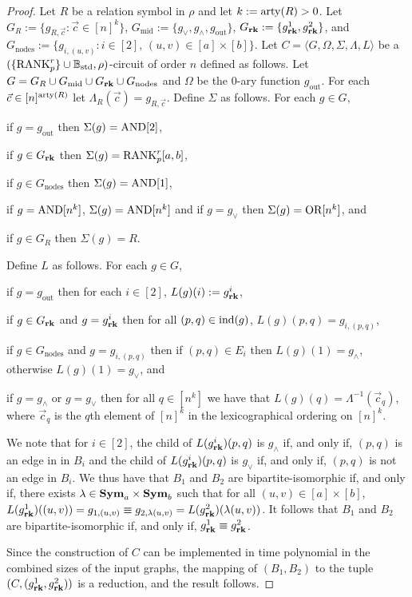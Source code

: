 \documentclass[../paper.tex]{subfiles}
\begin{document}
\begin{proof}
  Let $R$ be a relation symbol in $\rho$ and let $k := \mathrm{arty}(R) > 0$. Let $G_{R}
  := \{g_{R, \vec{c}} : \vec{c} \in [n]^k\}$, $G_{\text{mid}} := \{g_{\lor},
  g_{\land}, g_{\text{out}} \}$, $G_{\text{\textbf{rk}}} : = \{ g^1_{\text{\textbf{rk}}}, g^2_{\text{\textbf{rk}}}\}$,
  and $G_{\text{nodes}} := \{g_{i, (u,v)} : i \in [2] ,\, (u,v) \in [a] \times
  [b] \}$. Let $C = \langle G, \Omega, \Sigma, \Lambda, L \rangle$ be a
  $(\{\text{\upshape RANK}^{r}_p\} \cup \mathbb{B}_{\text{std}}, \rho)$-circuit of order $n$ defined as follows.
  Let $G = G_R \cup G_{\text{mid}} \cup G_{\text{\textbf{rk}}} \cup G_{\text{nodes}}$ and
  $\Omega$ be the $0$-ary function $g_{\text{out}}$. For each $\vec{c} \in
  [n]^{\mathrm{arty}(R)}$ let $\Lambda_R(\vec{c}) = g_{R, \vec{c}}$. Define $\Sigma$ as
  follows. For each $g \in G$,
  \begin{myitemize}
  \item if $g = g_{\text{out}}$ then $\Sigma(g) = \text{\upshape AND}[2]$,
  \item if $g \in G_{\text{\textbf{rk}}}$ then $\Sigma(g) = \text{\upshape RANK}^r_p [a,b]$,
  \item if $g \in G_{\text{nodes}}$ then $\Sigma(g) = \text{\upshape AND}[1]$,
  \item if $g = \text{\upshape AND}[n^k]$, $\Sigma (g) = \text{\upshape AND}[n^k]$ and if $g = g_{\lor}$ then
    $\Sigma(g) = \text{\upshape OR}[n^k]$, and
  \item if $g \in G_R$ then $\Sigma(g) = R$.
  \end{myitemize}
  Define $L$ as follows. For each $g \in G$,
  \begin{myitemize}
    \setlength\itemsep{0mm}
  \item if $g = g_{\text{out}}$ then for each $i \in [2]$, $L(g)(i) :=
    g^i_{\text{\textbf{rk}}}$,
  \item if $g \in G_{\text{\textbf{rk}}}$ and $g = g^i_{\text{\textbf{rk}}}$ then for all $(p,q) \in
    \text{\upshape ind}(g)$, $L(g)(p,q) = g_{i, (p,q)}$,
  \item if $g \in G_{\text{nodes}}$ and $g = g_{i, (p,q)}$ then if $(p, q) \in
    E_i$ then $L(g)(1) = g_{\land}$, otherwise $L(g)(1) = g_\lor$, and
  \item if $g = g_\land$ or $g = g_\lor$ then for all $q \in [n^k]$ we have that
    $L(g)(q) =\Lambda^{-1}(\vec{c}_q)$, where $\vec{c}_q$ is the $q$th element
    of $[n]^k$ in the lexicographical ordering on $[n]^k$.
  \end{myitemize}

  We note that for $i \in [2]$, the child of $L(g^i_{\text{\textbf{rk}}})(p,q)$ is $g_\land$
  if, and only if, $(p,q)$ is an edge in in $B_i$ and the child of
  $L(g^i_{\text{\textbf{rk}}})(p,q) $ is $g_\lor$ if, and only if, $(p,q)$ is not an edge in
  $B_i$. We thus have that $B_1$ and $B_2$ are bipartite-isomorphic if, and only
  if, there exists $\lambda \in \text{\textbf{Sym}}_{a} \times \text{\textbf{Sym}}_{b}$ such that for all
  $(u,v) \in [a] \times [b]$, $L(g^1_{\text{\textbf{rk}}})((u,v)) = g_{1, (u,v)} \equiv g_{2,
    \lambda (u,v)} = L(g^2_{\text{\textbf{rk}}})(\lambda (u,v))$. It follows that $B_1$ and
  $B_2$ are bipartite-isomorphic if, and only if, $g^1_{\text{\textbf{rk}}} \equiv
  g^2_{\text{\textbf{rk}}}$.

  Since the construction of $C$ can be implemented in time polynomial in the
  combined sizes of the input graphs, the mapping of $(B_1, B_2)$ to the tuple
  $(C, (g^1_{\text{\textbf{rk}}}, g^2_{\text{\textbf{rk}}}))$ is a reduction, and the result follows.
\end{proof}
\end{document}
